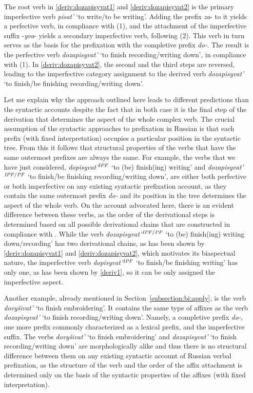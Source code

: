The root verb in \ref{deriv:dozapisyvat1} and \ref{deriv:dozapisyvat2} is the primary imperfective verb \textit{pisat'} `to write/to be writing'. Adding the prefix \textit{za}- to it yields a perfective verb, in compliance with (1), and the attachment of the imperfective suffix -\textit{yva}- yields a secondary imperfective verb, following (2). This verb in turn serves as the basis for the prefixation with the completive prefix \textit{do-}. The result is the perfective verb \textit{dozapisyvat'} `to finish recording/writing down', in compliance with (1).  In \ref{deriv:dozapisyvat2}, the second and the third steps are reversed, leading to the imperfective category assignment to the derived verb \textit{dozapisyvat'} `to finish/be finishing recording/writing down'.

Let me explain why the approach outlined here leads to different predictions than the syntactic accounts despite the fact that in both case it is the final step of the derivation that determines the aspect of the whole complex verb. The crucial assumption of the syntactic approaches to prefixation in Russian is that each prefix (with fixed interpretation) occupies a particular position in the syntactic tree. From this it follows that structural properties of the verbs that have the same outermost prefixes are always the same. For example, the verbs that we have just considered, \textit{dopisyvat'}$^{\mathit{IPF}}$ `to (be) finish(ing) writing' and \textit{dozapisyvat'}$^{{\mathit{IPF}}/{\mathit{PF}}}$ `to finish/be finishing recording/writing down', are either both perfective or both imperfective on any existing syntactic prefixation account, as they contain the same outermost prefix \textit{do-} and its position in the tree determines the aspect of the whole verb. On the account advocated here, there is an evident difference between these verbs, as the order of the derivational steps is determined based on all possible derivational chains that are constructed in compliance with . While the verb \textit{dozapisyvat'}$^{{\mathit{IPF}}/{\mathit{PF}}}$ `to (be) finish(ing) writing down/recording' has two derivational chains, as has been shown by \ref{deriv:dozapisyvat1} and \ref{deriv:dozapisyvat2}, which motivates its biaspectual nature, the imperfective verb \textit{dopisyvat'}$^{\mathit{IPF}}$ `to finish/be finishing writing' has only one, as has been shown by \ref{deriv1}, so it can be only assigned the imperfective aspect.

Another example, already mentioned in Section~\ref{subsection:bi:apply}, is the verb \textit{dovy\v{s}ivat'} `to finish embroidering'. It contains the same type of affixes as the verb \textit{dozapisyvat'} `to finish recording/writing down'. Namely, a completive prefix \textit{do-}, one more prefix commonly characterized as a lexical prefix, and the imperfective suffix. The verbs \textit{dovy\v{s}ivat'} `to finish embroidering' and \textit{dozapisyvat'} `to finish recording/writing down' are morphologically alike and thus there is no structural difference between them on any existing syntactic account of Russian verbal prefixation, as the structure of the verb and the order of the affix attachment is determined only on the basis of the syntactic properties of the affixes (with fixed interpretation).
 
